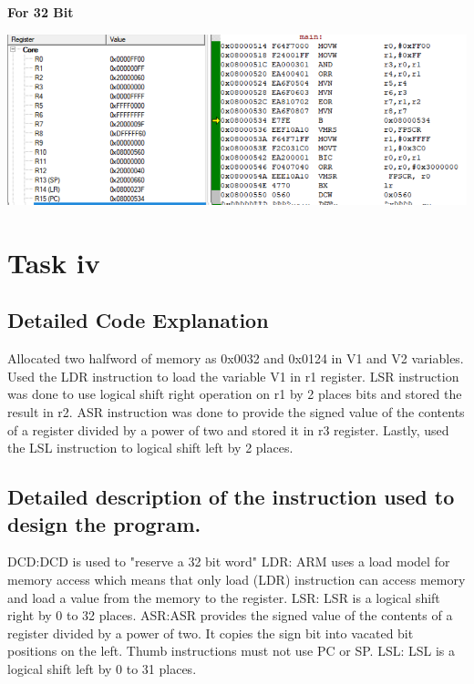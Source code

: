 \documentclass{article}
\begin{document}
\textbf{For 32 Bit}\newline\newline
\begin{center}
    \includegraphics[width=1\textwidth]{16Bit_After.png}
\end{center}

\section{Task iv} 

\subsection{Detailed Code Explanation}

Allocated two halfword of memory as 0x0032 and 0x0124 in V1 and V2 variables. Used the LDR instruction to load the variable V1 in r1 register. LSR instruction was done to use logical shift right operation on r1 by 2 places bits and stored the result in r2. ASR instruction was done to provide the signed value of the contents of a register divided by a power of two and stored it in r3 register. Lastly, used the LSL instruction to logical shift left by 2 places.

\subsection{Detailed description of the instruction used to design the program.}

DCD:DCD is used to "reserve a 32 bit word"\newline\newline
LDR: ARM uses a load model for memory access which means that only load (LDR) instruction can access memory and load a value from the memory to the register.\newline\newline
LSR: LSR is a logical shift right by 0 to 32 places.\newline\newline
ASR:ASR provides the signed value of the contents of a register divided by a power of two. It copies the sign bit into vacated bit positions on the left. Thumb instructions must not use PC or SP.\newline\newline
LSL: LSL is a logical shift left by 0 to 31 places.\newline\newline
\end{document}
